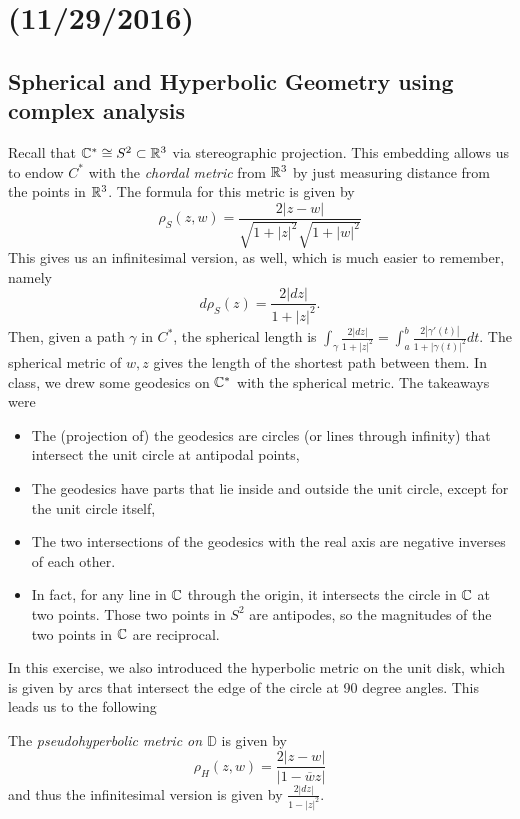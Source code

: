 \documentclass[11pt,leqno,oneside]{amsart}
\numberwithin{thm}{section}
\newcommand{\D}{\mathbb{D}}
\begin{document}
  \section{(11/29/2016)}
  \subsection*{Spherical and Hyperbolic Geometry using complex
    analysis}

  Recall that ${\mathbb C}^* \mathrel{\cong} S^2 \subset {\mathbb R}^3$ via stereographic
  projection. This embedding allows us to endow $C^*$ with the
  \emph{chordal metric} from ${\mathbb R}^3$ by just measuring distance from
  the points in ${\mathbb R}^3$. The formula for this metric is given by \[
    \rho_S(z,w) = \frac{2|z-w|}{\sqrt{1+|z|^2} \sqrt{1+|w|^2}}
  \]
  This gives us an infinitesimal version, as well, which is much easier
  to remember, namely \[
    d\rho_S(z) = \frac{2|dz|}{1+|z|^2}.
  \]
  Then, given a path $\gamma$ in $C^*$, the spherical length is
  $\int_\gamma \frac{2|dz|}{1+|z|^2} = \int_a^b
  \frac{2|\gamma'(t)|}{1+|\gamma(t)|^2}dt$. The spherical metric
  of $w,z$ gives the length of the shortest path between them. In
  class, we drew some geodesics on ${\mathbb C}^*$ with the spherical
  metric. The takeaways were
  \begin{itemize}
  \item The (projection of) the geodesics are circles (or lines through infinity) that
    intersect the unit circle at antipodal points,
  \item The geodesics have parts that lie inside and outside the unit
    circle, except for the unit circle itself,
  \item The two intersections of the geodesics with the real axis are
    negative inverses of each other.
  \item In fact, for any line in ${\mathbb C}$ through the origin, it intersects the circle in ${\mathbb C}$ at two points.  Those two points in $S^2$ are antipodes, so the magnitudes of the two points in ${\mathbb C}$ are reciprocal.
  \end{itemize}
  In this exercise, we also introduced the hyperbolic metric on the
  unit disk, which is given by arcs that intersect the edge of the
  circle at 90 degree angles. This leads us to the following
  \begin{defn}
    The \emph{pseudohyperbolic metric on $\D$} is given by \[
      \rho_H(z,w) = \frac{2|z-w|}{|1-\overline{w}z|}
    \]
    and thus the infinitesimal version is given by
    $\frac{2|dz|}{1-|z|^2}$.
  \end{defn}
\end{document}
